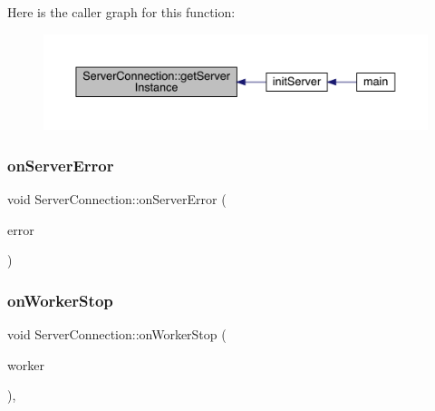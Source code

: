 Here is the caller graph for this function\+:
\nopagebreak
\begin{figure}[H]
\begin{center}
\leavevmode
\includegraphics[width=350pt]{d8/d64/a00181_ad64d541093e285a983911f22ab9a0bff_icgraph}
\end{center}
\end{figure}
\mbox{\label{a00181_ae97f8eaa15a3da8f069ad502e89039ae}} 
\subsubsection{\texorpdfstring{on\+Server\+Error}{onServerError}}
{\footnotesize\ttfamily void Server\+Connection\+::on\+Server\+Error (\begin{DoxyParamCaption}\item[{\hyperlink{a00104_a65727a063024ff0dedf1ac2f087f4165}{server\+Error}}]{error }\end{DoxyParamCaption})\hspace{0.3cm}{\ttfamily [signal]}}

\mbox{\label{a00181_af558fe509b60eb019281316513f6d188}} 
\subsubsection{\texorpdfstring{on\+Worker\+Stop}{onWorkerStop}}
{\footnotesize\ttfamily void Server\+Connection\+::on\+Worker\+Stop (\begin{DoxyParamCaption}\item[{\hyperlink{a00185}{Server\+Worker} $\ast$}]{worker }\end{DoxyParamCaption})\hspace{0.3cm}{\ttfamily [protected]}, {\ttfamily [slot]}}



